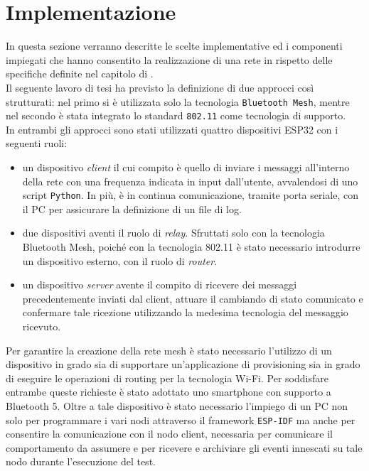 \chapter{Implementazione}
\label{ch:implementazione}

In questa sezione verranno descritte le scelte implementative ed i componenti impiegati che hanno consentito la realizzazione di una rete in rispetto delle specifiche definite nel capitolo di \textit{}.\\ 
Il seguente lavoro di tesi ha previsto la definizione di due approcci così strutturati: nel primo si è utilizzata solo la tecnologia \texttt{Bluetooth Mesh}, mentre nel secondo è stata integrato lo standard \texttt{802.11} come tecnologia di supporto.\\
In entrambi gli approcci sono stati utilizzati quattro dispositivi ESP32 con i seguenti ruoli: 

\begin{itemize}
    \item un dispositivo \textit{client} il cui compito è quello di inviare i messaggi all'interno della rete con una frequenza indicata in input dall'utente, avvalendosi di uno script \texttt{Python}. In più, è in continua comunicazione, tramite porta seriale, con il PC per assicurare la definizione di un file di log. 
    
    \item due dispositivi aventi il ruolo di \textit{relay}. Sfruttati solo con la tecnologia Bluetooth Mesh, poiché con la tecnologia 802.11 è stato necessario introdurre un dispositivo esterno, con il ruolo di \textit{router}.
    
    \item un dispositivo \textit{server} avente il compito di ricevere dei messaggi precedentemente inviati dal client, attuare il cambiando di stato comunicato e confermare tale ricezione utilizzando la medesima tecnologia del messaggio ricevuto.
\end{itemize}

\noindent Per garantire la creazione della rete mesh è stato necessario l'utilizzo di un dispositivo in grado sia di supportare un'applicazione di provisioning sia in grado di eseguire le operazioni di routing per la tecnologia Wi-Fi. Per soddisfare entrambe queste richieste è stato adottato uno smartphone con supporto a Bluetooth 5. Oltre a tale dispositivo è stato necessario l'impiego di un PC non solo per programmare i vari nodi attraverso il framework \texttt{ESP-IDF} ma anche per consentire la comunicazione con il nodo client, necessaria per comunicare il comportamento da assumere e per ricevere e archiviare gli eventi innescati su tale nodo durante l'esecuzione del test.

